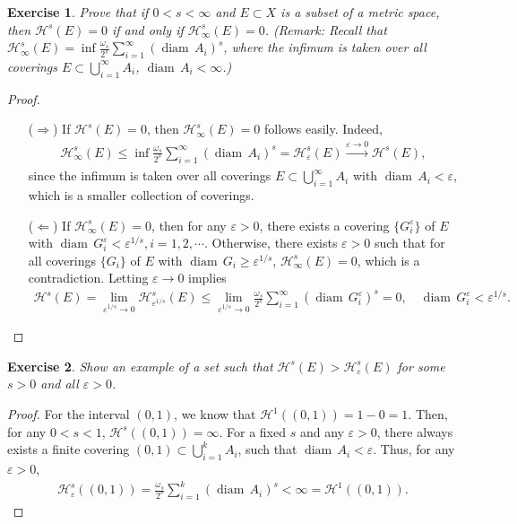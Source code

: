 \documentclass[11pt]{book}
\newtheorem{exercise}{Exercise}[chapter]
\theoremstyle{definition}
\numberwithin{equation}{chapter}
\def\H{{\mathcal H}}
\def\diam{{\operatorname{diam}\,}}
\begin{document}
\begin{exercise}
Prove that if $0 < s < \infty$ and $E \subset X$ is a subset of a metric space, then $\mathcal{H}^s(E) = 0$ if and only if $\mathcal{H}_\infty^s(E) = 0$. ({\em Remark}: Recall that $\mathcal{H}^s_\infty(E) = \inf \frac{\omega_s}{2^s} \sum_{i=1}^\infty (\diam A_i)^s$, where the infimum is taken over all coverings $E \subset \bigcup_{i=1}^\infty A_i$, $\diam A_i < \infty$.)
\end{exercise}
\begin{proof}
~\begin{enumerate}
    \item[($\Rightarrow$)] If $\H^s(E) = 0$, then  $\H^s_\infty(E) = 0$ follows easily. Indeed, \begin{align*}
        \H^s_\infty(E) \leq \inf \frac{\omega_s}{2^s} \sum_{i=1}^\infty (\diam A_i)^s = \H^s_\varepsilon(E) \xrightarrow[]{\varepsilon \to 0} \H^s(E),
    \end{align*}  
    since the infimum is taken over all coverings $E \subset \bigcup^\infty_{i=1} A_i$ with $\diam A_i < \varepsilon$, which is a smaller collection of coverings.
    
    \item[($\Leftarrow$)] If $\H^s_\infty(E) = 0$, then for any $\varepsilon > 0$, there exists a covering $\{G^\varepsilon_i\}$ of $E$ with $\diam G^\varepsilon_i < \varepsilon^{1/s}, i = 1,2,\cdots$. Otherwise, there exists $\varepsilon > 0$ such that for all coverings $\{G_i\}$ of $E$ with $\diam G_i \geq \varepsilon^{1/s}$, $\H^s_\infty(E) = 0$, which is a contradiction. Letting $\varepsilon \to 0$ implies
    \begin{align*}
        \H^s(E) = \lim_{\varepsilon^{1/s} \to 0}\H^s_{\varepsilon^{1/s}}(E) \leq \lim_{\varepsilon^{1/s} \to 0} \frac{\omega_s}{2^s} \sum^\infty_{i=1} (\diam G^\varepsilon_i)^s = 0, \quad \diam G^\varepsilon_i < \varepsilon^{1/s}.
    \end{align*}
\end{enumerate}
\end{proof}

\medskip

\begin{exercise}\label{exeercise_112}
Show an example of a set such that $\mathcal{H}^s(E) > \mathcal{H}^s_\varepsilon(E)$ for some $s > 0$ and all $\varepsilon > 0$.
\end{exercise}
\begin{proof}
For the interval $(0,1)$, we know that $\mathcal{H}^1((0,1)) = 1 - 0 = 1$. Then, for any $0 < s < 1$, $\mathcal{H}^s((0,1)) = \infty$. For a fixed $s$ and any $\varepsilon > 0$, there always exists a finite covering $(0,1) \subset \bigcup^k_{i=1} A_i$, such that $\diam A_i < \varepsilon$. Thus, for any $\varepsilon> 0$,
\begin{align*}
    \mathcal{H}^s_{\varepsilon}((0,1)) = \frac{\omega_s}{2^s} \sum^k_{i=1} (\diam A_i)^s < \infty = \mathcal{H}^1((0,1)).
\end{align*}
\end{proof}
\end{document}
